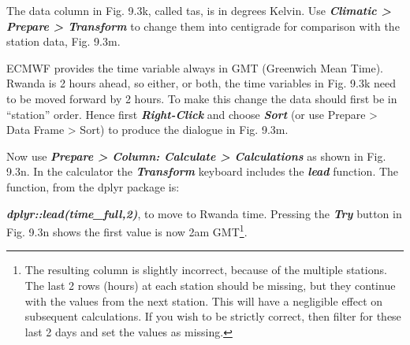 \documentclass[
  letterpaper,
  DIV=11,
  numbers=noendperiod]{scrreprt}
\begin{document}
The data column in Fig. 9.3k, called tas, is in degrees Kelvin. Use
\textbf{\emph{Climatic \textgreater{} Prepare \textgreater{} Transform}}
to change them into centigrade for comparison with the station data,
Fig. 9.3m.

ECMWF provides the time variable always in GMT (Greenwich Mean Time).
Rwanda is 2 hours ahead, so either, or both, the time variables in Fig.
9.3k need to be moved forward by 2 hours. To make this change the data
should first be in ``station'' order. Hence first
\textbf{\emph{Right-Click}} and choose \textbf{\emph{Sort}} (or use
Prepare \textgreater{} Data Frame \textgreater{} Sort) to produce the
dialogue in Fig. 9.3m.

Now use \textbf{\emph{Prepare \textgreater{} Column: Calculate
\textgreater{} Calculations}} as shown in Fig. 9.3n. In the calculator
the \textbf{\emph{Transform}} keyboard includes the \textbf{\emph{lead}}
function. The function, from the dplyr package is:

\textbf{\emph{dplyr::lead(time\_full,2)}}, to move to Rwanda time.
Pressing the \textbf{\emph{Try}} button in Fig. 9.3n shows the first
value is now 2am GMT\footnote{The resulting column is slightly
  incorrect, because of the multiple stations. The last 2 rows (hours)
  at each station should be missing, but they continue with the values
  from the next station. This will have a negligible effect on
  subsequent calculations. If you wish to be strictly correct, then
  filter for these last 2 days and set the values as missing.}.
\end{document}
